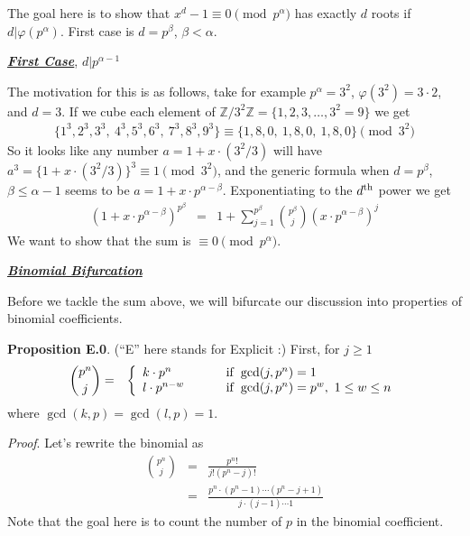 \documentclass[aps,preprint,preprintnumbers,nofootinbib,showpacs,prd]{revtex4-1}
\newcommand{\nbea}{\begin{eqnarray*}}
\newcommand{\neea}{\end{eqnarray*}}
\begin{document}
The goal here is to show that $x^d - 1 \equiv 0 \pmod{p^\alpha}$ has exactly $d$ roots if $d|\varphi(p^\alpha)$. First case is $d = p^\beta$, $\beta < \alpha$.

\bigskip
\underline{\textit{\textbf{First Case}}}, $d|p^{\alpha-1}$
\smallskip

The motivation for this is as follows, take for example $p^\alpha=3^2$, $\varphi(3^2) = 3\cdot 2$, and $d = 3$. If we cube each element of $\mathbb{Z}/3^2\mathbb{Z} = \{1,2,3,\dots,3^2 = 9\}$ we get
%
\nbea
\{1^3, 2^3, 3^3,~4^3, 5^3, 6^3,~7^3, 8^3, 9^3\} \equiv \{1, 8, 0,~1, 8, 0,~1, 8, 0\} \pmod{3^2}
\neea
%
So it looks like any number $a = 1 + x\cdot (3^2/3)$ will have $a^3 = \{1+x\cdot (3^2/3)\}^3 \equiv 1 \pmod{3^2}$, and the generic formula when $d = p^\beta$, $\beta \le \alpha - 1$ seems to be $a = 1 + x\cdot p^{\alpha-\beta}$. Exponentiating to the $d^{\rm th}$ power we get
%
\nbea
(1 + x\cdot p^{\alpha-\beta})^{p^\beta} & = & 1 + \sum_{j=1}^{p^\beta}\binom{p^\beta}{j} (x\cdot p^{\alpha-\beta})^j
\neea
%
We want to show that the sum is $\equiv 0 \pmod{p^\alpha}$. 

\smallskip
\underline{\textit{\textbf{Binomial Bifurcation}}}
\smallskip

Before we tackle the sum above, we will bifurcate our discussion into properties of binomial coefficients.

{\bf Proposition E.0}. (``E'' here stands for Explicit :) First, for $j \ge 1$ 
%
\nbea
\binom{p^n}{j} & = & \left\{
\begin{array}{l l}
k \cdot p^n & ~~~~~~~ {\rm if ~} \gcd(j,p^n) = 1 \\
l \cdot p^{n-w} & ~~~~~~~ {\rm if ~} \gcd(j,p^n) = p^w, ~ 1 \le w \le n
\end{array} \right.
\neea
%
where $\gcd(k,p) = \gcd(l,p) = 1$.

{\it Proof}. Let's rewrite the binomial as
%
\nbea
\binom{p^n}{j} & = & \frac{p^n!}{j!(p^n - j)!} \\
& = & \frac{p^n\cdot(p^n-1)\cdots (p^n - j + 1)}{j\cdot(j-1)\cdots 1}
\neea
%
Note that the goal here is to count the number of $p$ in the binomial coefficient.
\end{document}
